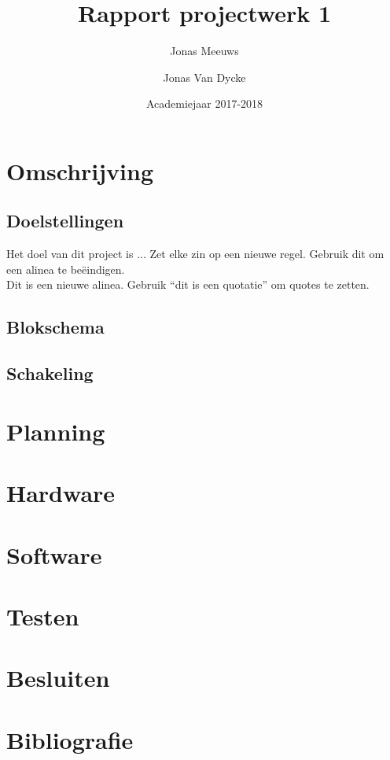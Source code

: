 \documentclass[a4paper]{report}
\title{Rapport projectwerk 1}
\author{Jonas Meeuws \and Jonas Van Dycke}
\date{Academiejaar 2017-2018}
\begin{document}
\maketitle
\tableofcontents

\chapter{Omschrijving}
\section{Doelstellingen}
Het doel van dit project is ...
Zet elke zin op een nieuwe regel.
Gebruik dit om een alinea te beëindigen.\\

Dit is een nieuwe alinea.
Gebruik ``dit is een quotatie'' om quotes te zetten.

\section{Blokschema}
\section{Schakeling}

\chapter{Planning}

\chapter{Hardware}

\chapter{Software}

\chapter{Testen}

\chapter{Besluiten}

\chapter{Bibliografie}
\end{document}

